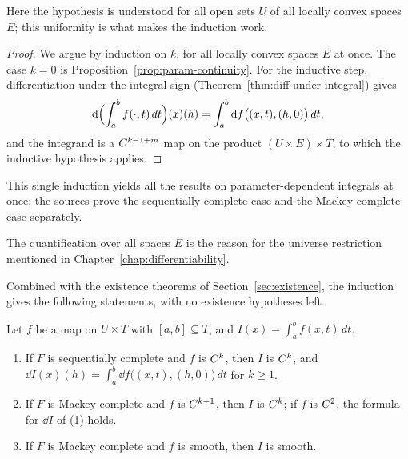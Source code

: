Here the hypothesis is understood for all open sets $U$ of all locally convex spaces $E$; this
uniformity is what makes the induction work.

\begin{proof}
  \leanok
  We argue by induction on $k$, for all locally convex spaces $E$ at once. The case $k = 0$ is
  Proposition~\ref{prop:param-continuity}. For the inductive step, differentiation under the
  integral sign (Theorem~\ref{thm:diff-under-integral}) gives
  \[
    \mathrm{d}\Bigl(\int_a^b f(\cdot, t)\, dt\Bigr)(x)(h) = \int_a^b \mathrm{d} f\bigl((x, t), (h, 0)\bigr)\, dt ,
  \]
  and the integrand is a $C^{k - 1 + m}$ map on the product $(U \times E) \times T$, to which
  the inductive hypothesis applies.
\end{proof}

\begin{remark}
  This single induction yields all the results on parameter-dependent integrals at once; the
  sources prove the sequentially complete case and the Mackey complete case separately.
\end{remark}

\begin{remark}[Lean]
  The quantification over all spaces $E$ is the reason for the universe restriction mentioned in
  Chapter~\ref{chap:differentiability}.
\end{remark}

Combined with the existence theorems of Section~\ref{sec:existence}, the induction gives the
following statements, with no existence hypotheses left.

\begin{corollary}
  \label{cor:param}
  \leanok
  Let $f$ be a map on $U \times T$ with $[a, b] \subseteq T$, and
  $I(x) = \int_a^b f(x, t)\, dt$.
  \begin{enumerate}
    \item If $F$ is sequentially complete and $f$ is $C^{k}$, then $I$ is $C^{k}$, and
    $\dd I(x)(h) = \int_a^b \dd f\bigl((x,t), (h,0)\bigr)\, dt$ for $k \geq 1$.
    \item If $F$ is Mackey complete and $f$ is $C^{k+1}$, then $I$ is $C^{k}$; if $f$ is
    $C^{2}$, the formula for $\dd I$ of (1) holds.
    \item If $F$ is Mackey complete and $f$ is smooth, then $I$ is smooth.
  \end{enumerate}
\end{corollary}

